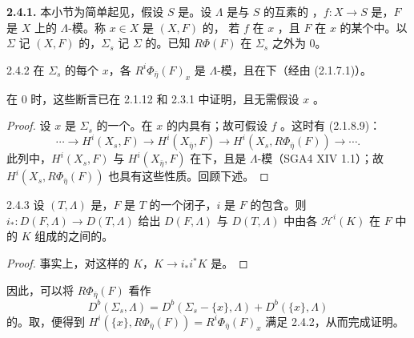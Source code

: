 \textbf{2.4.1.} 本小节为简单起见，假设 $S$ 是。设 $\Lambda$ 是与 $S$ 的互素的 ，$f:X\to S$ 是，$F$ 是 $X$ 上的 $\Lambda$-模。称 $x\in X$ 是 $(X,F)$ 的，
若 $f$ 在 $x$ ，且 $F$ 在 $x$ 的某个中。以 $\Sigma$ 记 $(X,F)$ 的，$\Sigma_s$ 记 $\Sigma$ 的。已知 $R\Phi(F)$ 在 $\Sigma_s$ 之外为 $0$。
\begin{SGAresult}{}{2.4.2}
在 $\Sigma_s$ 的每个 $x$，各 $R^i\Phi_{\bar\eta}(F)_x$ 是 $\Lambda$-模，且在下（经由 (2.1.7.1)）。
\end{SGAresult}
在 $0$ 时，这些断言已在 2.1.12 和 2.3.1 中证明，且无需假设 $x$ 。
\begin{proof}
设 $x$ 是 $\Sigma_s$ 的一个。在 $x$ 的内具有；故可假设 $f$ 。这时有 (2.1.8.9)：
\[\cdots\longrightarrow H^i(X_s,F)\longrightarrow H^i(X_{\bar\eta},F)\longrightarrow H^i(X_s,R\Phi_{\bar\eta}(F))\longrightarrow\cdots.\]
此列中，$H^i(X_s,F)$ 与 $H^i(X_{\bar\eta},F)$ 在下，且是 $\Lambda$-模（SGA4 XIV 1.1）；故 $H^i(X_s,R\Phi_{\bar\eta}(F))$ 也具有这些性质。回顾下述。
\end{proof}
\begin{SGAresult}{}{2.4.3}
设 $(T,\Lambda)$ 是，$F$ 是 $T$ 的一个闭子，$i$ 是 $F$ 的包含。则 $i_*:D(F,\Lambda)\to D(T,\Lambda)$ 给出 $D(F,\Lambda)$ 与 $D(T,\Lambda)$ 中由各 $\mathscr H^i(K)$ 在 $F$ 中的 $K$ 组成的之间的。
\end{SGAresult}
\begin{proof}
事实上，对这样的 $K$，$K\to i_*i^*K$ 是。
\end{proof}
因此，可以将 $R\Phi_{\bar\eta}(F)$ 看作
\[D^b(\Sigma_s,\Lambda)=D^b(\Sigma_s-\{x\},\Lambda)+D^b(\{x\},\Lambda)\]
的。取，便得到 $H^i(\{x\},R\Phi_{\bar\eta}(F))=R^i\Phi_{\bar\eta}(F)_x$ 满足 2.4.2，从而完成证明。

